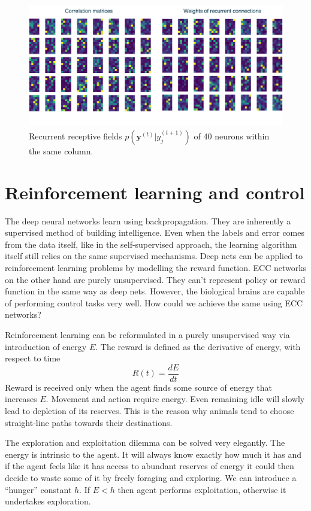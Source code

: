 \documentclass[12pt]{article}
\begin{document}
\begin{figure}[!htbp]
	\centering
	\includegraphics[width=13.8cm]{recurrent_connections}
	\caption{Recurrent receptive fields $p(\boldsymbol{y}^{(t)}|y_j^{(t+1)})$ of 40 neurons within the same column. }
	\label{fig:recurrent_connections}
\end{figure} 

\section{Reinforcement learning and control}

The deep neural networks learn using backpropagation. They are inherently a supervised method of building intelligence. Even when the labels and error comes from the data itself, like in the self-supervised approach, the learning algorithm itself still relies on the same supervised mechanisms. Deep nets can be applied to reinforcement learning problems by modelling the reward function. ECC networks on the other hand are purely unsupervised. They can't represent policy or reward function in the same way as deep nets. However, the biological brains are capable of performing control tasks very well. How could we achieve the same using ECC networks?


Reinforcement learning can be reformulated in a purely unsupervised way via introduction of energy $E$. The reward is defined as the derivative of energy, with respect to time
\[
R(t) = \frac{dE}{dt}
\]
Reward is received only when the agent finds some source of energy that increases $E$.
Movement and action require energy. Even remaining idle will slowly lead to depletion of its reserves. This is the reason why animals tend to choose straight-line paths towards their destinations. 

The exploration and exploitation dilemma can be solved very elegantly. The energy is intrinsic to the agent. It will always know exactly how much it has and if the agent feels like it has access to abundant reserves of energy it could then decide to waste some of it by freely foraging and exploring. We can introduce a ``hunger'' constant  $h$. If $E<h$ then agent performs exploitation, otherwise it undertakes exploration.
\end{document}
